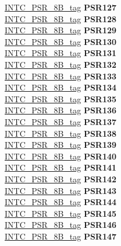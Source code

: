 \begin{DoxyCompactItemize}
\begin{tabbing}
\>\>\mbox{\hyperlink{unionINTC__PSR__8B__tag}{INTC\_PSR\_8B\_tag}} {\bfseries PSR127}\\
\>\>\mbox{\hyperlink{unionINTC__PSR__8B__tag}{INTC\_PSR\_8B\_tag}} {\bfseries PSR128}\\
\>\>\mbox{\hyperlink{unionINTC__PSR__8B__tag}{INTC\_PSR\_8B\_tag}} {\bfseries PSR129}\\
\>\>\mbox{\hyperlink{unionINTC__PSR__8B__tag}{INTC\_PSR\_8B\_tag}} {\bfseries PSR130}\\
\>\>\mbox{\hyperlink{unionINTC__PSR__8B__tag}{INTC\_PSR\_8B\_tag}} {\bfseries PSR131}\\
\>\>\mbox{\hyperlink{unionINTC__PSR__8B__tag}{INTC\_PSR\_8B\_tag}} {\bfseries PSR132}\\
\>\>\mbox{\hyperlink{unionINTC__PSR__8B__tag}{INTC\_PSR\_8B\_tag}} {\bfseries PSR133}\\
\>\>\mbox{\hyperlink{unionINTC__PSR__8B__tag}{INTC\_PSR\_8B\_tag}} {\bfseries PSR134}\\
\>\>\mbox{\hyperlink{unionINTC__PSR__8B__tag}{INTC\_PSR\_8B\_tag}} {\bfseries PSR135}\\
\>\>\mbox{\hyperlink{unionINTC__PSR__8B__tag}{INTC\_PSR\_8B\_tag}} {\bfseries PSR136}\\
\>\>\mbox{\hyperlink{unionINTC__PSR__8B__tag}{INTC\_PSR\_8B\_tag}} {\bfseries PSR137}\\
\>\>\mbox{\hyperlink{unionINTC__PSR__8B__tag}{INTC\_PSR\_8B\_tag}} {\bfseries PSR138}\\
\>\>\mbox{\hyperlink{unionINTC__PSR__8B__tag}{INTC\_PSR\_8B\_tag}} {\bfseries PSR139}\\
\>\>\mbox{\hyperlink{unionINTC__PSR__8B__tag}{INTC\_PSR\_8B\_tag}} {\bfseries PSR140}\\
\>\>\mbox{\hyperlink{unionINTC__PSR__8B__tag}{INTC\_PSR\_8B\_tag}} {\bfseries PSR141}\\
\>\>\mbox{\hyperlink{unionINTC__PSR__8B__tag}{INTC\_PSR\_8B\_tag}} {\bfseries PSR142}\\
\>\>\mbox{\hyperlink{unionINTC__PSR__8B__tag}{INTC\_PSR\_8B\_tag}} {\bfseries PSR143}\\
\>\>\mbox{\hyperlink{unionINTC__PSR__8B__tag}{INTC\_PSR\_8B\_tag}} {\bfseries PSR144}\\
\>\>\mbox{\hyperlink{unionINTC__PSR__8B__tag}{INTC\_PSR\_8B\_tag}} {\bfseries PSR145}\\
\>\>\mbox{\hyperlink{unionINTC__PSR__8B__tag}{INTC\_PSR\_8B\_tag}} {\bfseries PSR146}\\
\>\>\mbox{\hyperlink{unionINTC__PSR__8B__tag}{INTC\_PSR\_8B\_tag}} {\bfseries PSR147}\\

\end{tabbing}
\end{DoxyCompactItemize}
